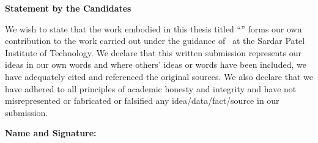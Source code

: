 \newpage
\thispagestyle{empty}
\vspace*{0.2cm}
\vspace{1cm}
\begin{center}
\large\textbf{Statement by the Candidates}
\end{center}
\vspace{2cm}
We wish to state that the work embodied in this thesis titled ``\ProjectTitle'' forms our own contribution to the work carried out under the guidance of \GuideName\ at the Sardar Patel Institute of Technology. We declare that this written submission represents our ideas in our own words and where others' ideas or words have been included, we have adequately cited and referenced the original sources. We also declare that we have adhered to all principles of academic honesty and integrity and have not misrepresented or fabricated or falsified any idea/data/fact/source in our submission.\par
\vspace{6cm}
\noindent\textbf{Name and Signature:}\\
\StudentsSignature
\newpage
